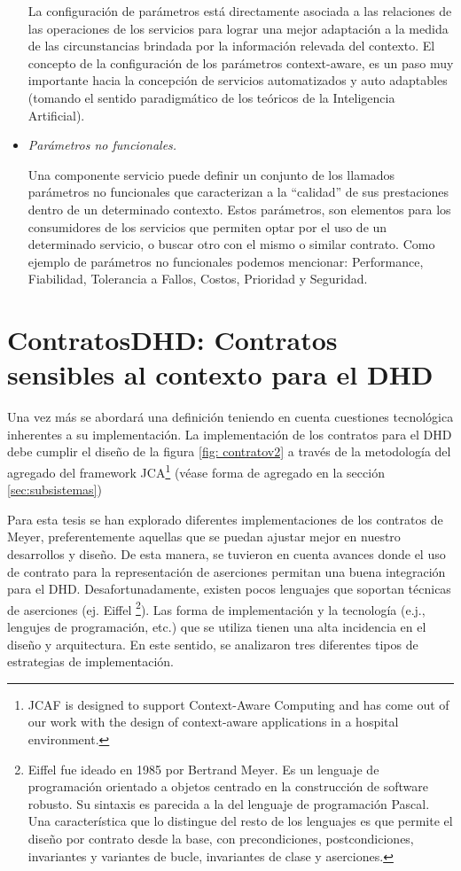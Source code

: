\begin{itemize}
La configuración de parámetros está directamente asociada a las relaciones de
las operaciones de los servicios para lograr una mejor adaptación a la medida de
las circunstancias brindada por la información relevada del contexto. El
concepto de la configuración de los parámetros context-aware, es un paso muy
importante hacia la concepción de servicios automatizados y auto adaptables
(tomando el sentido paradigmático de los teóricos de la Inteligencia
Artificial).


\item \textit{Parámetros no funcionales.} 

Una componente servicio puede definir un conjunto de los llamados parámetros no
funcionales que caracterizan a la “calidad” de sus prestaciones dentro de un
determinado contexto. Estos parámetros, son elementos para los consumidores de
los servicios que permiten optar por el uso de un determinado servicio, o buscar
otro con el mismo o similar contrato. Como ejemplo de parámetros no funcionales
podemos mencionar: Performance, Fiabilidad, Tolerancia a Fallos, Costos,
Prioridad y Seguridad.

\end{itemize}




\section{ContratosDHD: Contratos sensibles al contexto para el DHD}
\label{sec:estrategiasca}


Una vez más se abordará una definición teniendo en cuenta cuestiones
tecnológica inherentes a su implementación. La implementación
de los contratos para el DHD debe cumplir el dise\~no de la figura \ref{fig:
contratov2} a través de la metodología del agregado del framework JCA\footnote{JCAF is designed to support Context-Aware Computing and has
come out of our work with the design of context-aware applications in a hospital
environment.} (véase forma de agregado en la sección \ref{sec:subsistemas})
 



Para esta tesis se han explorado diferentes implementaciones de los
contratos de Meyer, preferentemente aquellas que se puedan ajustar mejor en
nuestro desarrollos y dise\~no. De esta manera, se tuvieron en cuenta avances
donde el uso de contrato para la representación de aserciones permitan
una buena integración para el DHD. Desafortunadamente, existen pocos lenguajes
que soportan técnicas de aserciones (ej. Eiffel \footnote{Eiffel fue ideado en
1985 por Bertrand Meyer. Es un lenguaje de programación orientado a objetos
centrado en la construcción de software robusto. Su sintaxis es parecida a la
del lenguaje de programación Pascal. Una característica que lo distingue del
resto de los lenguajes es que permite el diseño por contrato desde la base, con
precondiciones, postcondiciones, invariantes y variantes de bucle, invariantes
de clase y aserciones.}). Las forma de implementación y la tecnología (e.j.,
lengujes de programación, etc.) que se utiliza tienen una alta incidencia en
el dise\~no y arquitectura. En este sentido, se analizaron tres diferentes tipos
de estrategias de implementación.

